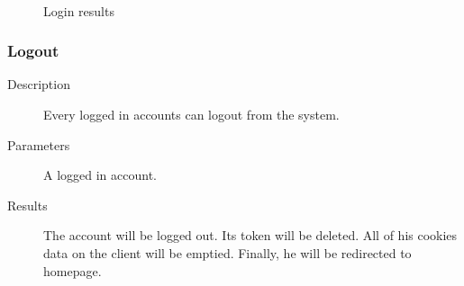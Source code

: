\begin{figure}[bth]
\myfloatalign
{} \quad
{} \\
\caption[Login results]{Login results}
\label{fig:user_guide:login:result}
\end{figure}

\clearpage

\subsubsection{Logout}
\label{ch:result:user_guide:miscellaneous:logout}

\begin{description}
\item[Description] Every logged in accounts can logout from the system.
\item[Parameters] A logged in account.
\item[Results] The account will be logged out.
Its token will be deleted.
All of his cookies data on the client will be emptied.
Finally, he will be redirected to homepage.
\end{description}


